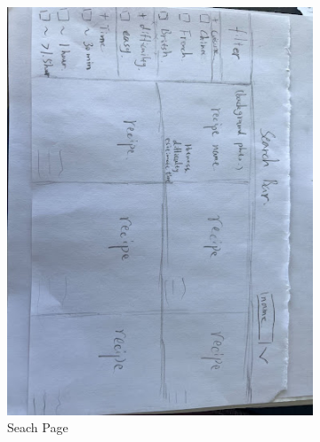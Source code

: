 \documentclass[11pt,english]{article}
\begin{document}
\begin{figure}
  \centering
  \begin{subfigure}[b]{0.4\linewidth}
    \includegraphics[width=\linewidth]{figure3v1.jpg}
    \caption{Seach Page}
  \end{subfigure}
  \begin{subfigure}[b]{0.4\linewidth}

\end{subfigure}
\end{figure}
\end{document}
